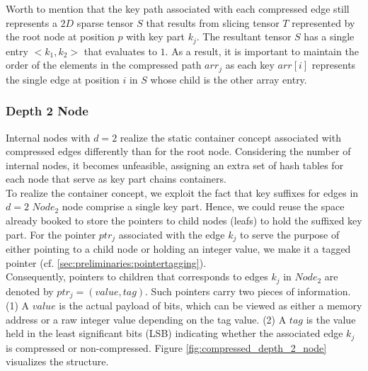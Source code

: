 Worth to mention that the key path associated with each compressed edge still represents a $2D$ sparse tensor $S$ that results from slicing tensor $T$ represented by the root node at position $p$ with key part $k_{j}$. The resultant tensor $S$ has a single entry $<k_{1}, k_{2}>$ that evaluates to $1$. 
As a result, it is important to maintain the order of the elements in the compressed path $arr_{j}$ as each key $arr[i]$ represents the single edge at position $i$ in $S$ whose child is the other array entry. \\

\subsubsection{Depth 2 Node} Internal nodes with $d=2$ realize the static container concept associated with compressed edges differently than for the root node. 
Considering the number of internal nodes, it becomes unfeasible, assigning an extra set of hash tables for each node that serve as key part chains containers. \\

To realize the container concept, we exploit the fact that key suffixes for edges in $d=2$ $Node_{2}$ node comprise a single key part.
Hence, we could reuse the space already booked to store the pointers to child nodes (leafs) to hold the suffixed key part.
For the pointer $ptr_{j}$ associated with the edge $k_{j}$ to serve the purpose of either pointing to a child node or holding an integer value, we make it a tagged pointer (cf. \ref{sec:preliminaries:pointertagging}). \\

Consequently, pointers to children that corresponds to edges $k_{j}$ in $Node_{2}$ are denoted by $ptr_{j} = (value, tag)$. Such pointers carry two pieces of information. (1) A $value$ is the actual payload of bits, which can be viewed as either a memory address or a raw integer value depending on the tag value. (2) A $tag$ is the value held in the least significant bits (LSB) indicating whether the associated edge $k_{j}$ is compressed or non-compressed. Figure \ref{fig:compressed_depth_2_node} visualizes the structure.

